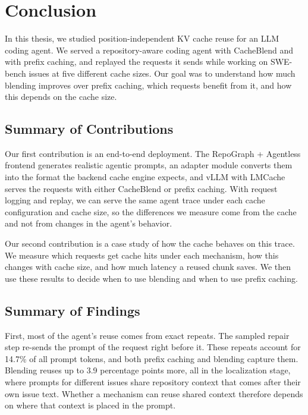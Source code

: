 \chapter{Conclusion}
\label{cha:conclusion}

In this thesis, we studied position-independent KV cache reuse for an LLM coding agent. We served a repository-aware coding agent with CacheBlend and with prefix caching, and replayed the requests it sends while working on SWE-bench issues at five different cache sizes. Our goal was to understand how much blending improves over prefix caching, which requests benefit from it, and how this depends on the cache size.

\section{Summary of Contributions}
\label{sec:conclusion_contributions}

Our first contribution is an end-to-end deployment. The RepoGraph + Agentless frontend generates realistic agentic prompts, an adapter module converts them into the format the backend cache engine expects, and vLLM with LMCache serves the requests with either CacheBlend or prefix caching. With request logging and replay, we can serve the same agent trace under each cache configuration and cache size, so the differences we measure come from the cache and not from changes in the agent's behavior.

Our second contribution is a case study of how the cache behaves on this trace. We measure which requests get cache hits under each mechanism, how this changes with cache size, and how much latency a reused chunk saves. We then use these results to decide when to use blending and when to use prefix caching.

\section{Summary of Findings}
\label{sec:conclusion_findings}

First, most of the agent's reuse comes from exact repeats. The sampled repair step re-sends the prompt of the request right before it. These repeats account for 14.7\% of all prompt tokens, and both prefix caching and blending capture them. Blending reuses up to 3.9 percentage points more, all in the localization stage, where prompts for different issues share repository context that comes after their own issue text. Whether a mechanism can reuse shared context therefore depends on where that context is placed in the prompt.

